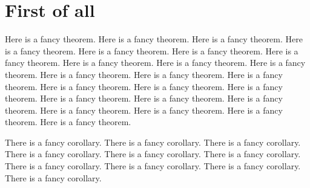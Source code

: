 
\section{First of all}

\begin{theorem}
    Here is a fancy theorem. Here is a fancy theorem. Here is a fancy theorem. Here is a fancy theorem. Here is a fancy theorem. Here is a fancy theorem. Here is a fancy theorem. Here is a fancy theorem. Here is a fancy theorem. Here is a fancy theorem. Here is a fancy theorem. Here is a fancy theorem. Here is a fancy theorem. Here is a fancy theorem. Here is a fancy theorem. Here is a fancy theorem. Here is a fancy theorem. Here is a fancy theorem. Here is a fancy theorem. Here is a fancy theorem. Here is a fancy theorem. Here is a fancy theorem. Here is a fancy theorem. 
\end{theorem}

\begin{cor}
    There is a fancy corollary. There is a fancy corollary. There is a fancy corollary. There is a fancy corollary. There is a fancy corollary. There is a fancy corollary. There is a fancy corollary. There is a fancy corollary. There is a fancy corollary. There is a fancy corollary. 
\end{cor}